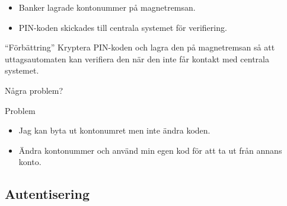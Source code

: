\documentclass{beamer}
\theoremstyle{definition}
\theoremstyle{remark}
\begin{document}
\begin{frame}
  \begin{example}
    \begin{itemize}
      \item Banker lagrade kontonummer på magnetremsan.
      \item PIN-koden skickades till centrala systemet för verifiering.
    \end{itemize}
  \end{example}

  \pause{}

  \begin{alertblock}{\enquote{Förbättring}}
    Kryptera PIN-koden och lagra den på magnetremsan så att uttagsautomaten kan 
    verifiera den när den inte får kontakt med centrala systemet.
  \end{alertblock}

  \pause{}

  \begin{exercise}
    Några problem?
  \end{exercise}
\end{frame}

\begin{frame}
  \begin{alertblock}{Problem}
    \begin{itemize}
      \item Jag kan byta ut kontonumret men inte ändra koden.
      \item Ändra kontonummer och använd min egen kod för att ta ut från annans 
        konto.
    \end{itemize}
  \end{alertblock}
\end{frame}

\subsection{Autentisering}
\end{document}
